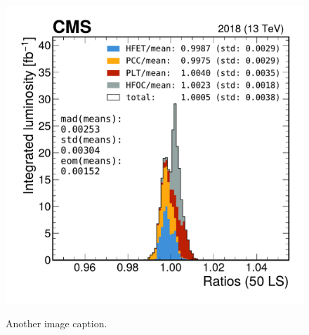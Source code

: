 \begin{figure}[h]
\begin{minipage}{0.48\textwidth}
{    \includegraphics[scale=.4]{Chapter3/2018_stability/stacked__hfet-pcc-plt-hfocdivmean_PCConly.pdf}
    }
    \caption{Another image caption.}
    \label{AnotherImage}
  \end{minipage}
\end{figure}




